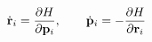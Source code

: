 \documentclass[preview]{standalone}
\begin{document}
\begin{align*}
\special{dvisvgm:raw <g id='unique000'>}\dot{\va r}_i=\pdv{H}{\va p_i},\qquad \dot{\va p}_i=-\pdv{H}{\va r_i}\special{dvisvgm:raw </g>}
\end{align*}
\end{document}
